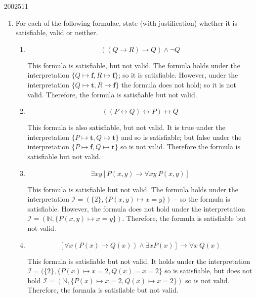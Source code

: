 \documentclass[10pt,\jkfside,a4paper]{article}
\begin{document}
\begin{examquestion}{2002}{5}{11}

\begin{enumerate}

\item For each of the following formulae, state (with justification) whether
it is satisfiable, valid or neither.

\begin{enumerate}

\item \[
\left( \left( Q \to R \right) \to Q \right) \wedge \neg Q
\]

This formula is satisfiable, but not valid. The formula holds under the
interpretation $\{Q \mapsto \mathbf{f}, R \mapsto \mathbf{f}\}$; so it is
satisfiable. However, under the interpretation $\{Q \mapsto \mathbf{t}, R
\mapsto \mathbf{f}\}$ the formula does not hold; so it is not valid.
Therefore, the formula is satisfiable but not valid.

\item \[
\left( \left( P \leftrightarrow Q \right) \leftrightarrow P \right)
\leftrightarrow Q
\]

This formula is also satisfiable, but not valid. It is true under the
interpretation $\{P \mapsto \mathbf{t}, Q \mapsto \mathbf{t}\}$ and so is
satisfiable; but false under the interpretation $\{P \mapsto \mathbf{f}, Q
\mapsto \mathbf{t}\}$ so is not valid. Therefore the formula is satisfiable
but not valid.

\item \[
\exists xy \left[ P(x, y) \to \forall xy \ P(x,y) \right]
\]

This formula is satisfiable but not valid. The formula holds under the
interpretation $\mathcal{I} = (\{2\}, \{P(x, y) \mapsto x = y\})$ --
so the formula is satisfiable. However, the formula does not hold under the
interpretation $\mathcal{I} = (\mathbb{N}, \{P(x, y) \mapsto x = y\})$.
Therefore, the formula is satisfiable but not valid.

\item \[
\left[ \forall x \left( P(x) \to Q(x) \right) \wedge \exists x P(x)
\right] \to \forall x \ Q(x)
\]

This formula is satisfiable but not valid. It holds under the interpretation\\
$\mathcal{I} = (\{2\}, \{P(x) \mapsto x = 2, Q(x) = x = 2\}$ so is
satisfiable, but does not hold $\mathcal{I} = (\mathbb{N}, \{P(x) \mapsto x =
2, Q(x) \mapsto x = 2\})$ so is not valid. Therefore, the formula is
satisfiable but not valid.


\end{enumerate}
\end{enumerate}
\end{examquestion}
\end{document}
